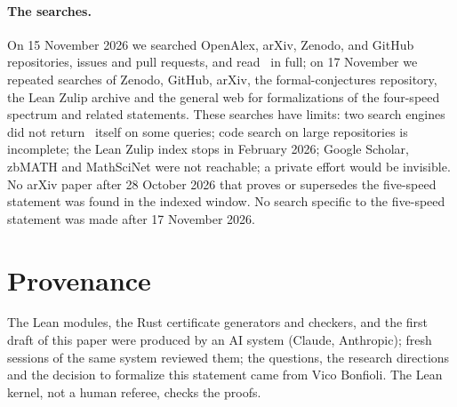 \documentclass[11pt]{article}
\theoremstyle{remark}
\begin{document}
\paragraph{The searches.} On 15 November 2026 we searched OpenAlex, arXiv, Zenodo, and GitHub repositories, issues and pull requests, and read~\cite{YGB} in full; on 17 November we repeated searches of Zenodo, GitHub, arXiv, the formal-conjectures repository, the Lean Zulip archive and the general web for formalizations of the four-speed spectrum and related statements. These searches have limits: two search engines did not return~\cite{YGB} itself on some queries; code search on large repositories is incomplete; the Lean Zulip index stops in February 2026; Google Scholar, zbMATH and MathSciNet were not reachable; a private effort would be invisible. No arXiv paper after 28 October 2026 that proves or supersedes the five-speed statement was found in the indexed window. No search specific to the five-speed statement was made after 17 November 2026.

\section{Provenance}\label{sec:prov}

The Lean modules, the Rust certificate generators and checkers, and the first draft of this paper were produced by an AI system (Claude, Anthropic); fresh sessions of the same system reviewed them; the questions, the research directions and the decision to formalize this statement came from Vico Bonfioli. The Lean kernel, not a human referee, checks the proofs.

\appendix
\end{document}
